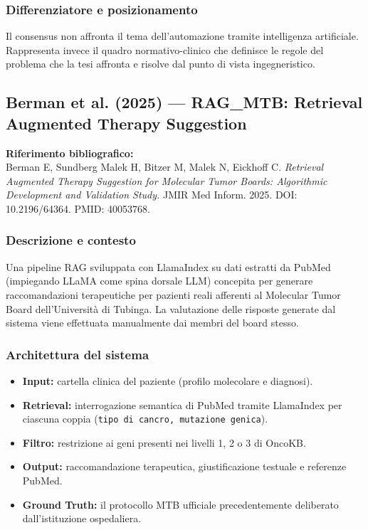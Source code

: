 \documentclass[11pt,a4paper]{article}
\newcommand{\code}[1]{\texttt{\small #1}}
\begin{document}
\subsubsection*{Differenziatore e posizionamento}
Il consensus non affronta il tema dell'automazione tramite intelligenza artificiale. Rappresenta invece il quadro normativo-clinico che definisce le regole del problema che la tesi affronta e risolve dal punto di vista ingegneristico.

\subsection{Berman et al. (2025) --- RAG\_MTB: Retrieval Augmented Therapy Suggestion}

\noindent\textbf{Riferimento bibliografico:}\\
Berman E, Sundberg Malek H, Bitzer M, Malek N, Eickhoff C. \textit{Retrieval Augmented Therapy Suggestion for Molecular Tumor Boards: Algorithmic Development and Validation Study.} JMIR Med Inform. 2025. DOI: 10.2196/64364. PMID: 40053768.

\subsubsection*{Descrizione e contesto}
Una pipeline RAG sviluppata con LlamaIndex su dati estratti da PubMed (impiegando LLaMA come spina dorsale LLM) concepita per generare raccomandazioni terapeutiche per pazienti reali afferenti al Molecular Tumor Board dell'Università di Tubinga. La valutazione delle risposte generate dal sistema viene effettuata manualmente dai membri del board stesso.

\subsubsection*{Architettura del sistema}
\begin{itemize}
  \item \textbf{Input:} cartella clinica del paziente (profilo molecolare e diagnosi).
  \item \textbf{Retrieval:} interrogazione semantica di PubMed tramite LlamaIndex per ciascuna coppia (\code{tipo di cancro, mutazione genica}).
  \item \textbf{Filtro:} restrizione ai geni presenti nei livelli 1, 2 o 3 di OncoKB.
  \item \textbf{Output:} raccomandazione terapeutica, giustificazione testuale e referenze PubMed.
  \item \textbf{Ground Truth:} il protocollo MTB ufficiale precedentemente deliberato dall'istituzione ospedaliera.
\end{itemize}
\end{document}
